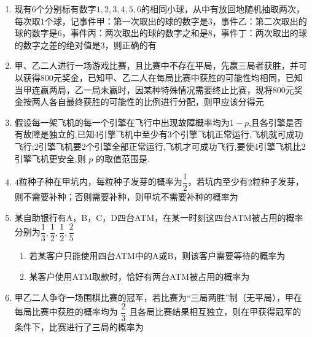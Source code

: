 \begin{enumerate}
        
    \item 现有$6$个分别标有数字$1,2,3,4,5,6$的相同小球，从中有放回地随机抽取两次，每次取$1$个球，记事件甲：第一次取出的球的数字是$3$，事件乙：第二次取出的球的数字是$6$，事件丙：两次取出的球的数字之和是$8$，事件丁：两次取出的球的数字之差的绝对值是$3$，则正确的有
    
    
        
    \item 甲、乙二人进行一场游戏比赛，且比赛中不存在平局，先赢三局者获胜，并可以获得$800$元奖金，已知甲、乙二人在每局比赛中获胜的可能性均相同，已知当甲连赢两局，乙一局未赢时，因某种特殊情况需要终止比赛，现将$800$元奖金按两人各自最终获胜的可能性的比例进行分配，则甲应该分得元

    \item 假设每一架飞机的每一个引擎在飞行中出现故障概率均为$1-p$,且各引擎是否有故障是独立的,已知4引擎飞机中至少有3个引擎飞机正常运行,飞机就可成功飞行;2引擎飞机要2个引擎全部正常运行,飞机才可成功飞行,要使4引擎飞机比2引擎飞机更安全,则 $p$ 的取值范围是.
    
    \item $4$粒种子种在甲坑内，每粒种子发芽的概率为$\dfrac{1}{2}$，若坑内至少有$2$粒种子发芽，则不需要补种；否则需要补种，则甲坑不需要补种的概率为
    
    \item 某自助银行有A，B，C，D四台ATM，在某一时刻这四台ATM被占用的概率分别为$\dfrac{1}{3},\dfrac{1}{2},\dfrac{1}{2},\dfrac{2}{5}$
    \begin{enumerate}
    \item 若某客户只能使用四台ATM中的A或B，则该客户需要等待的概率为
    \item 某客户使用ATM取款时，恰好有两台ATM被占用的概率为
    \end{enumerate}

    \item 甲乙二人争夺一场围棋比赛的冠军，若比赛为“三局两胜”制（无平局），甲在每局比赛中获胜的概率均为 $\dfrac{2}{3}$ 且各局比赛结果相互独立，则在甲获得冠军的条件下，比赛进行了三局的概率为


\end{enumerate}
